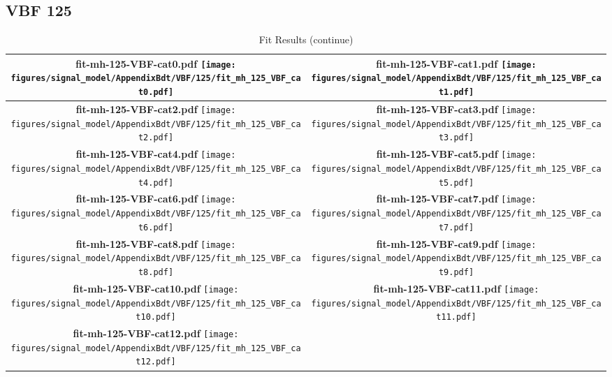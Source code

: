 \subsection{VBF 125}
\begin{longtable}{|c|c|}
\caption{Fit Results}
\endfirsthead
\caption{Fit Results (continue)}
\endhead
\hline
\parbox{0.47\textwidth}{
\centering
{\bfseries fit-mh-125-VBF-cat0.pdf}
\texttt{[image: figures/signal\_model/AppendixBdt/VBF/125/fit\_mh\_125\_VBF\_cat0.pdf]}
}
 & \parbox{0.47\textwidth}{
\centering
{\bfseries fit-mh-125-VBF-cat1.pdf}
\texttt{[image: figures/signal\_model/AppendixBdt/VBF/125/fit\_mh\_125\_VBF\_cat1.pdf]}
}
 \\
\hline
\parbox{0.47\textwidth}{
\centering
{\bfseries fit-mh-125-VBF-cat2.pdf}
\texttt{[image: figures/signal\_model/AppendixBdt/VBF/125/fit\_mh\_125\_VBF\_cat2.pdf]}
}
 & \parbox{0.47\textwidth}{
\centering
{\bfseries fit-mh-125-VBF-cat3.pdf}
\texttt{[image: figures/signal\_model/AppendixBdt/VBF/125/fit\_mh\_125\_VBF\_cat3.pdf]}
}
 \\
\hline
\parbox{0.47\textwidth}{
\centering
{\bfseries fit-mh-125-VBF-cat4.pdf}
\texttt{[image: figures/signal\_model/AppendixBdt/VBF/125/fit\_mh\_125\_VBF\_cat4.pdf]}
}
 & \parbox{0.47\textwidth}{
\centering
{\bfseries fit-mh-125-VBF-cat5.pdf}
\texttt{[image: figures/signal\_model/AppendixBdt/VBF/125/fit\_mh\_125\_VBF\_cat5.pdf]}
}
 \\
\hline
\parbox{0.47\textwidth}{
\centering
{\bfseries fit-mh-125-VBF-cat6.pdf}
\texttt{[image: figures/signal\_model/AppendixBdt/VBF/125/fit\_mh\_125\_VBF\_cat6.pdf]}
}
 & \parbox{0.47\textwidth}{
\centering
{\bfseries fit-mh-125-VBF-cat7.pdf}
\texttt{[image: figures/signal\_model/AppendixBdt/VBF/125/fit\_mh\_125\_VBF\_cat7.pdf]}
}
 \\
\hline
\parbox{0.47\textwidth}{
\centering
{\bfseries fit-mh-125-VBF-cat8.pdf}
\texttt{[image: figures/signal\_model/AppendixBdt/VBF/125/fit\_mh\_125\_VBF\_cat8.pdf]}
}
 & \parbox{0.47\textwidth}{
\centering
{\bfseries fit-mh-125-VBF-cat9.pdf}
\texttt{[image: figures/signal\_model/AppendixBdt/VBF/125/fit\_mh\_125\_VBF\_cat9.pdf]}
}
 \\
\hline
\parbox{0.47\textwidth}{
\centering
{\bfseries fit-mh-125-VBF-cat10.pdf}
\texttt{[image: figures/signal\_model/AppendixBdt/VBF/125/fit\_mh\_125\_VBF\_cat10.pdf]}
}
 & \parbox{0.47\textwidth}{
\centering
{\bfseries fit-mh-125-VBF-cat11.pdf}
\texttt{[image: figures/signal\_model/AppendixBdt/VBF/125/fit\_mh\_125\_VBF\_cat11.pdf]}
}
 \\
\hline
\parbox{0.47\textwidth}{
\centering
{\bfseries fit-mh-125-VBF-cat12.pdf}
\texttt{[image: figures/signal\_model/AppendixBdt/VBF/125/fit\_mh\_125\_VBF\_cat12.pdf]}
}
 & \\ \hline
\end{longtable}
